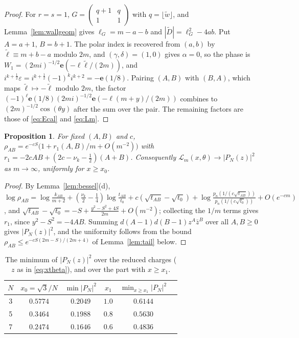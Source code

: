 \documentclass[11pt]{amsart}
\numberwithin{equation}{section}
\theoremstyle{plain}
\newtheorem{prop}[thm]{Proposition}
\theoremstyle{definition}
\theoremstyle{remark}
\newcommand{\cL}{\mathcal{L}}
\newcommand{\e}{\mathbf{e}}
\newcommand{\sm}[4]{\left(\begin{smallmatrix}#1&#2\\#3&#4\end{smallmatrix}\right)}
\begin{document}
\begin{proof}
For $r=s=1$, $G=\sm{q+1}q11$ with $q=\lfloor\tilde w\rfloor$, and Lemma~\ref{lem:wallgeom} gives $\ell_G=m-a-b$ and $|\tilde D|=\ell_G^2-4ab$. Put $A=a+1$, $B=b+1$. The polar index is recovered from $(a,b)$ by $\tilde\ell\equiv m+b-a$ modulo $2m$, and $(\gamma,\delta)=(1,0)$ gives $\alpha=0$, so the phase is $W_1=(2mi)^{-1/2}\e(-\ell\tilde\ell/(2m))$, and $i^{k+\frac12}\varepsilon=i^{k+\frac12}(-1)^ki^{k+2}=-\e(1/8)$. Pairing $(A,B)$ with $(B,A)$, which maps $\tilde\ell\mapsto-\tilde\ell$ modulo $2m$, the factor $(-1)^\ell\e(1/8)(2mi)^{-1/2}\e(-\ell(m+y)/(2m))$ combines to $(2m)^{-1/2}\cos(\theta y)$ after the sum over the pair. The remaining factors are those of \eqref{eq:Ecal} and \eqref{eq:Lm}.
\end{proof}

\begin{prop}\label{prop:limit}
For fixed $(A,B)$ and $c$, $\rho_{AB}=e^{-cS}\bigl(1+r_1(A,B)/m+O(m^{-2})\bigr)$ with $r_1=-2cAB+(2c-\nu_k-\frac12)(A+B)$. Consequently $\cL_m(x,\theta)\to|P_N(z)|^2$ as $m\to\infty$, uniformly for $x\ge x_0$.
\end{prop}

\begin{proof}
By Lemma~\ref{lem:bessel}(d), $\log\rho_{AB}=\log\frac{k_{AB}}{m+2}+(\frac{\nu_k}{2}-\frac14)\log\frac{t_{AB}}{t_0}+c(\sqrt{t_{AB}}-\sqrt{t_0})+\log\frac{p_n(1/(c\sqrt{t_{AB}}))}{p_n(1/(c\sqrt{t_0}))}+O(e^{-cm})$, and $\sqrt{t_{AB}}-\sqrt{t_0}=-S+\frac{y^2-S^2+4S}{2m}+O(m^{-2})$; collecting the $1/m$ terms gives $r_1$, since $y^2-S^2=-4AB$. Summing $d(A-1)d(B-1)z^A\bar z^B$ over all $A,B\ge0$ gives $|P_N(z)|^2$, and the uniformity follows from the bound $\rho_{AB}\le e^{-cS(2m-S)/(2m+4)}$ of Lemma~\ref{lem:tail} below.
\end{proof}

\begin{table}[t]
\centering
\caption{The minimum of $|P_N(z)|^2$ over the reduced charges ($z$ as in \eqref{eq:xtheta}), and over the part with $x\ge x_1$.}
\label{tab:Pmin}
\begin{tabular}{cccccc}
\toprule
$N$&$x_0=\sqrt3/N$&$\min|P_N|^2$&$x_1$&$\min_{x\ge x_1}|P_N|^2$\\
\midrule
3&$0.5774$&$0.2049$&$1.0$&$0.6144$\\
5&$0.3464$&$0.1988$&$0.8$&$0.5630$\\
7&$0.2474$&$0.1646$&$0.6$&$0.4836$\\
\bottomrule
\end{tabular}
\end{table}
\end{document}
